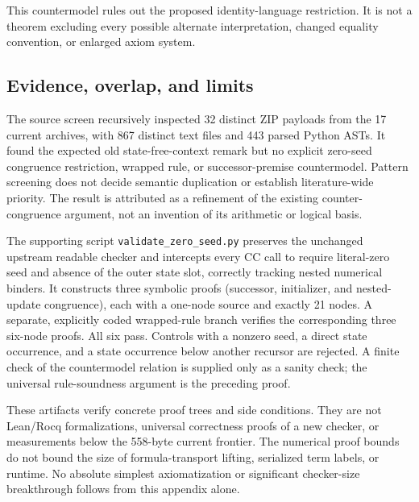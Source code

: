 This countermodel rules out the proposed identity-language restriction.
It is not a theorem excluding every possible alternate interpretation,
changed equality convention, or enlarged axiom system.

\subsection{Evidence, overlap, and limits}

The source screen recursively inspected 32 distinct ZIP payloads from the
17 current archives, with 867 distinct text files and 443 parsed Python
ASTs. It found the expected old state-free-context remark but no explicit
zero-seed congruence restriction, wrapped rule, or successor-premise
countermodel. Pattern screening does not decide semantic duplication or
establish literature-wide priority. The result is attributed as a
refinement of the existing counter-congruence argument, not an invention
of its arithmetic or logical basis.

The supporting script \texttt{validate\_zero\_seed.py} preserves the
unchanged upstream readable checker and intercepts every CC call to
require literal-zero seed and absence of the outer state slot, correctly
tracking nested numerical binders. It constructs three symbolic proofs
(successor, initializer, and nested-update congruence), each with a one-node
source and exactly 21 nodes. A separate, explicitly coded wrapped-rule
branch verifies the corresponding three six-node proofs. All six pass.
Controls with a nonzero seed, a direct state occurrence, and a state
occurrence below another recursor are rejected. A finite check of the
countermodel relation is supplied only as a sanity check; the universal
rule-soundness argument is the preceding proof.

These artifacts verify concrete proof trees and side conditions. They are
not Lean/Rocq formalizations, universal correctness proofs of a new checker,
or measurements below the 558-byte current frontier. The numerical proof
bounds do not bound the size of formula-transport lifting, serialized term
labels, or runtime. No absolute simplest axiomatization or significant
checker-size breakthrough follows from this appendix alone.
